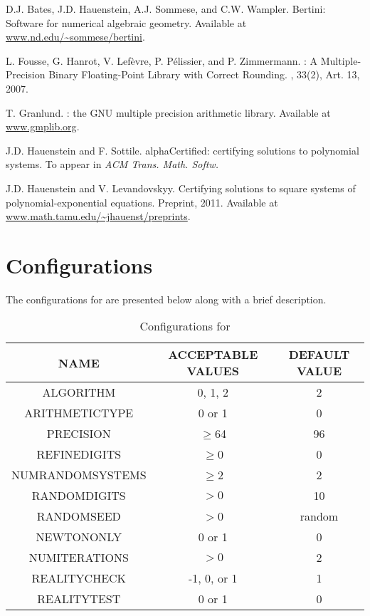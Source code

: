 \documentclass[11pt]{report}
\begin{document}
\begin{thebibliography}{1}

D.J. Bates, J.D. Hauenstein, A.J. Sommese, and C.W. Wampler.
\newblock Bertini: Software for numerical algebraic geometry.
\newblock Available at \url{www.nd.edu/\~sommese/bertini}.

L. Fousse, G. Hanrot, V. Lef\`evre, P. P\'elissier, and P. Zimmermann.
: A Multiple-Precision Binary Floating-Point Library with Correct Rounding.
, 33(2), Art. 13, 2007.

T. Granlund.
: the GNU multiple precision arithmetic library.
\newblock Available at \url{www.gmplib.org}.

J.D. Hauenstein and F. Sottile.
\newblock alphaCertified: certifying solutions to polynomial systems.
\newblock To appear in {\em ACM Trans. Math. Softw.}

J.D. Hauenstein and V. Levandovskyy.
\newblock Certifying solutions to square systems of polynomial-exponential equations.
\newblock Preprint, 2011. Available at \url{www.math.tamu.edu/\~jhauenst/preprints}.


\end{thebibliography}

\appendix
\chapter{Configurations}\label{CHAP:configs}

\vskip -0.2in
The configurations for \blueharvestS are presented below
along with a brief description.

\begin{table}[h!]\label{good_settings}
\centering
\caption{Configurations for \blueharvest}
\begin{tabular}{|c|c|c|}
\hline
NAME & ACCEPTABLE VALUES & DEFAULT VALUE\\
\hline
\hline
ALGORITHM & 0, 1, 2 & 2\\
\hline
ARITHMETICTYPE & 0 or 1 & 0\\
\hline
PRECISION & $\geq$64 & 96\\
\hline
REFINEDIGITS & $\geq$0 & 0 \\
\hline
NUMRANDOMSYSTEMS & $\geq$2 & 2 \\
\hline
RANDOMDIGITS & $>0$ & 10 \\
\hline
RANDOMSEED & $>$0 & random \\
\hline
NEWTONONLY & 0 or 1 & 0 \\
\hline
NUMITERATIONS & $>0$ & 2 \\
\hline
REALITYCHECK & -1, 0, or 1 & 1 \\
\hline
REALITYTEST & 0 or 1 & 0 \\
\hline
\end{tabular}
\end{table}
\end{document}
